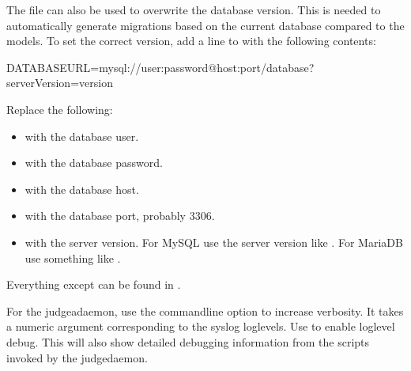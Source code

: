 \documentclass[a4paper,10pt,english,openany]{sphinxmanual}
\begin{document}
\sphinxAtStartPar
The  file can also be used to overwrite the database
version. This is needed to automatically generate migrations based on the
current database compared to the models. To set the correct version, add a line
to  with the following contents:

\begin{sphinxVerbatim}[commandchars=\\\{\}]
DATABASE\PYGZus{}URL=mysql://\PYGZlt{}user\PYGZgt{}:\PYGZlt{}password\PYGZgt{}@\PYGZlt{}host\PYGZgt{}:\PYGZlt{}port\PYGZgt{}/\PYGZlt{}database\PYGZgt{}?serverVersion=\PYGZlt{}version\PYGZgt{}
\end{sphinxVerbatim}

\sphinxAtStartPar
Replace the following:
\begin{itemize}
\item {} 
\sphinxAtStartPar
{} with the database user.

\item {} 
\sphinxAtStartPar
{} with the database password.

\item {} 
\sphinxAtStartPar
{} with the database host.

\item {} 
\sphinxAtStartPar
{} with the database port, probably 3306.

\item {} 
\sphinxAtStartPar
{} with the server version. For MySQL use the server version
like . For MariaDB use something like .

\end{itemize}

\sphinxAtStartPar
Everything except  can be found in .

\sphinxAtStartPar
For the judgeadaemon, use the  commandline option to increase
verbosity. It takes a numeric argument corresponding to the syslog
loglevels. Use  to enable loglevel debug. This will also show
detailed debugging information from the scripts invoked by the
judgedaemon.
\end{document}
